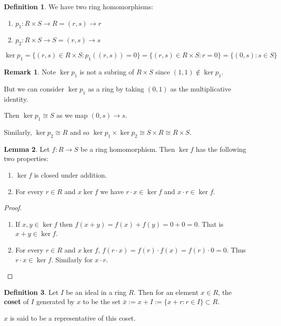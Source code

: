 \documentclass[12pt,a4paper]{article}
\theoremstyle{definition}
\newtheorem{definition}{Definition}[subsection]
\newtheorem{lemma}[definition]{Lemma}
\newtheorem*{remark}{Remark}
\begin{document}
\begin{definition}
	We have two ring homomorphisms:
	\begin{enumerate}
		\item $p_1: R \times S \rightarrow R = (r, s) \rightarrow r$
		\item $p_2: R \times S \rightarrow S = (r, s) \rightarrow s$
	\end{enumerate}

	$\ker p_1 = \{(r, s) \in R \times S: p_1((r, s)) = 0\} = \{(r, s) \in R \times S: r = 0\} = \{(0, s): s \in S\}$
\end{definition}

\begin{remark}
	Note $\ker p_1$ is not a subring of $R \times S$ since $(1, 1) \notin \ker p_1$.

	But we can consider $\ker p_1$ as a ring by taking $(0, 1)$ as the multiplicative identity.

	Then $\ker p_1 \cong S$ as we map $(0, s) \rightarrow s$.

	Similarly, $\ker p_2 \cong R$ and so $\ker p_1 \times \ker p_2 \cong S \times R \cong R \times S$.
\end{remark}

\begin{lemma}
	Let $f: R \rightarrow S$ be a ring homomorphism. Then $\ker f$ has the following two properties:
	\begin{enumerate}
		\item $\ker f$ is closed under addition.
		\item For every $r \in R$ and $x \ker f$ we have $r \cdot x \in \ker f$ and $x \cdot r \in \ker f$.
	\end{enumerate}
\end{lemma}

\begin{proof}
	\begin{enumerate}
		\item If $x, y \in \ker f$ then $f(x + y) = f(x) + f(y) = 0 + 0 = 0$. That is $x + y \in \ker f$.
		\item For every $r \in R$ and $x \ker f$, $f(r \cdot x) = f(r) \cdot f(x) = f(r) \cdot 0 = 0$. Thus $r \cdot x \in \ker f$. Similarly for $x \cdot r$.
	\end{enumerate}
\end{proof}

\begin{definition}
	Let $I$ be an ideal in a ring $R$. Then for an element $x \in R$, the \textbf{coset} of $I$ generated by $x$ to be the set $\bar{x} := x + I := \{ x + r: r \in I \} \subset R$.

	$x$ is said to be a representative of this coset.
\end{definition}
\end{document}
